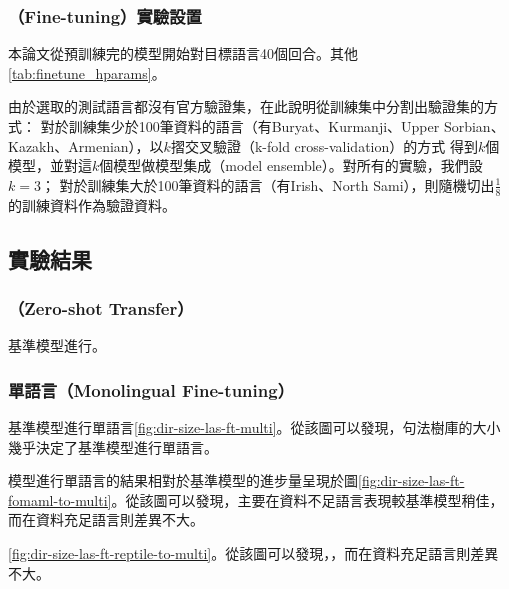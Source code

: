 \subsubsection{\finetune（Fine-tuning）實驗設置}
本論文從預訓練完的模型開始對目標語言\finetune 40個回合。其他\ref{tab:finetune_hparams}。

由於選取的測試語言都沒有官方驗證集，在此說明從訓練集中分割出驗證集的方式：
對於訓練集少於100筆資料的語言（有Buryat、Kurmanji、Upper Sorbian、Kazakh、Armenian），以$k$摺交叉驗證（k-fold cross-validation）的方式
得到$k$個模型，並對這$k$個模型做模型集成（model ensemble）。對所有的實驗，我們設$k = 3$；
對於訓練集大於100筆資料的語言（有Irish、North Sami），則隨機切出$\frac{1}{8}$的訓練資料作為驗證資料。

\subsection{實驗結果}
\subsubsection{\zeroshot（Zero-shot Transfer）}
%
基準模型進行。%
\iffalse

\fi
\subsubsection{單語言\finetune（Monolingual Fine-tuning）}

基準模型進行單語言\ref{fig:dir-size-las-ft-multi}。從該圖可以發現，句法樹庫的大小幾乎決定了基準模型進行單語言。

模型進行單語言的結果相對於基準模型的進步量呈現於圖\ref{fig:dir-size-las-ft-fomaml-to-multi}。從該圖可以發現，主要在資料不足語言表現較基準模型稍佳，而在資料充足語言則差異不大。

\ref{fig:dir-size-las-ft-reptile-to-multi}。從該圖可以發現，，而在資料充足語言則差異不大。







